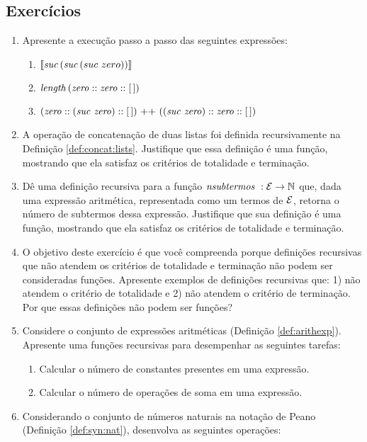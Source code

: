 \subsection{Exerc\'icios}

\begin{enumerate}
  \item Apresente a execu\c{c}\~ao passo a passo das seguintes express\~oes:
  \begin{enumerate}
    \item $\llbracket \textit{suc\/}\, (\textit{suc\/}\, (suc\,\,zero))\rrbracket$
    \item $\textit{length\/}\, (\textit{zero\/} :: \textit{zero\/} :: [\,])$
    \item $(\textit{zero\/} :: (\textit{suc\/}\,\, \textit{zero\/}) ::[\,])\text{ ++ }((\textit{suc\/}\,\,\textit{zero\/}) :: \textit{zero\/} :: [\,])$
  \end{enumerate}
  \item A operação de concatenação de duas listas foi definida recursivamente na Definição \ref{def:concat:lists}. Justifique que essa definição é uma fun\c{c}\~ao, mostrando que ela satisfaz  os critérios de totalidade e termina\c{c}\~ao.
  \item Dê uma defini\c{c}\~ao recursiva para a função $\textit{nsubtermos }: \mathcal{E} \rightarrow \mathbb{N}$ que, dada uma express\~ao aritm\'etica, representada como um termos de $\mathcal{E}$, retorna o número de subtermos dessa expressão. Justifique que sua definição é uma função, mostrando que ela satisfaz os critérios de totalidade e termina\c{c}\~ao.
  \item O objetivo deste exerc\'icio \'e que você compreenda porque defini\c{c}\~oes recursivas que n\~ao atendem os crit\'erios de totalidade e termina\c{c}\~ao n\~ao podem ser consideradas fun\c{c}\~oes.
        Apresente exemplos de defini\c{c}\~oes recursivas que: 1) n\~ao atendem o crit\'erio de totalidade e 2) n\~ao atendem o crit\'erio de termina\c{c}\~ao. Por que essas definições n\~ao podem ser fun\c{c}\~oes?
  \item Considere o conjunto de expressões aritméticas (Definição \ref{def:arithexp}). Apresente uma funções recursivas para desempenhar as seguintes tarefas:
  \begin{enumerate}
       \item Calcular o número de constantes presentes em uma expressão.
       \item Calcular o número de operações de soma em uma expressão.
  \end{enumerate}
  \item Considerando o conjunto de números naturais na notação de Peano (Definição \ref{def:syn:nat}), desenvolva as seguintes operações:

\end{enumerate}
